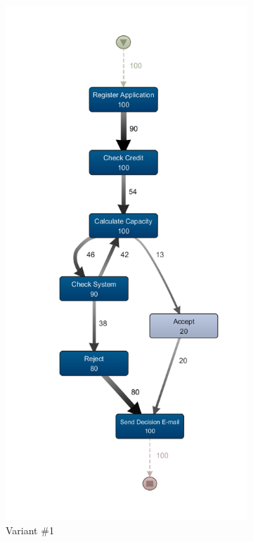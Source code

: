 \begin{figure}
\centering
  \begin{subfigure}{.4\textwidth}
    \centering
    \includegraphics[width=.8\linewidth]{5_results_discussions/loan-application-process/ETM_Configuration1}
    \caption{Variant \#1}
    \label{fig:loan-application-process-models-1}
  \end{subfigure}%
  \begin{subfigure}{.4\textwidth}
    \centering

\end{subfigure}
\end{figure}
